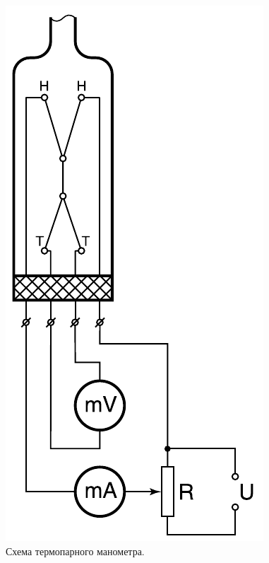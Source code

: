 \documentclass[a4paper,12pt]{article}
\begin{document}
\begin{figure}[H]
  \begin{minipage}{0.3\textwidth}
    \centering
    \includegraphics[width=0.9\linewidth]{data/ЛТ.png}
    \caption{Схема термопарного манометра.\label{fig:Схема термопарного монометра}}
  \end{minipage}\hfill
  \begin{minipage}{0.8\textwidth}

\end{minipage}
\end{figure}
\end{document}
